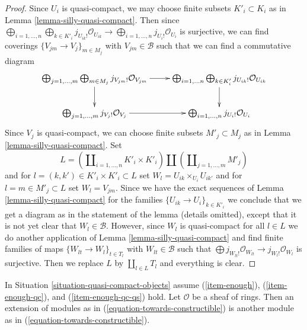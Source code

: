 \begin{proof}
Since $U_i$ is quasi-compact, we may choose finite subsets $K'_i \subset K_i$
as in Lemma \ref{lemma-silly-quasi-compact}.
Then since
$\bigoplus_{i = 1, \ldots, n}
\bigoplus_{k \in K'_i} j_{U_{ik}!}\mathcal{O}_{U_{ik}} \to
\bigoplus_{i = 1, \ldots, n} j_{U_i!}\mathcal{O}_{U_i}$ is surjective,
we can find coverings $\{V_{jm} \to V_j\}_{m \in M_j}$ with
$V_{jm} \in \mathcal{B}$ such that we can find a commutative diagram
$$
\xymatrix{
\bigoplus_{j = 1, \ldots, m} \bigoplus_{m \in M_j}
j_{V_{jm}!}\mathcal{O}_{V_{jm}} \ar[d] \ar[r] &
\bigoplus_{i = 1, \ldots n} \bigoplus_{k \in K'_i}
j_{U_{ik}!}\mathcal{O}_{U_{ik}} \ar[d] \\
\bigoplus_{j = 1, \ldots, m} j_{V_j!}\mathcal{O}_{V_j} \ar[r] &
\bigoplus_{i = 1, \ldots, n} j_{U_i!}\mathcal{O}_{U_i}
}
$$
Since $V_j$ is quasi-compact, we can choose finite subsets
$M'_j \subset M_j$ as in Lemma \ref{lemma-silly-quasi-compact}.
Set
$$
L = \left(\coprod\nolimits_{i = 1, \ldots, n} K'_i \times K'_i \right)
\coprod
\left(\coprod\nolimits_{j = 1, \ldots, m} M'_j\right)
$$
and for $l = (k, k') \in K'_i \times K'_i \subset L$ set
$W_l = U_{ik} \times_{U_i} U_{ik'}$ and for
$l = m \in M'_j \subset L$ set $W_l = V_{jm}$.
Since we have the exact sequences of Lemma \ref{lemma-silly-quasi-compact}
for the families $\{U_{ik} \to U_i\}_{k \in K'_i}$
we conclude that we get a diagram as in the statement of the lemma
(details omitted), except that it is not yet clear that $W_l \in \mathcal{B}$.
However, since $W_l$ is quasi-compact for all $l \in L$
we do another application of Lemma \ref{lemma-silly-quasi-compact}
and find finite families of maps $\{W_{lt} \to W_l\}_{t \in T_l}$
with $W_{lt} \in \mathcal{B}$ such that
$\bigoplus j_{W_{lt}!}\mathcal{O}_{W_{lt}} \to j_{W_l!}\mathcal{O}_{W_l}$
is surjective. Then we replace $L$ by $\coprod_{l \in L} T_l$
and everything is clear.
\end{proof}

\begin{lemma}
\label{lemma-extension-towards-constructibles}
In Situation \ref{situation-quasi-compact-objects} assume
(\ref{item-enough}), (\ref{item-enough-qc}), and (\ref{item-enough-qc-qs})
hold. Let $\mathcal{O}$ be a sheaf of rings.
Then an extension of modules as in (\ref{equation-towards-constructible})
is another module as in (\ref{equation-towards-constructible}).
\end{lemma}

